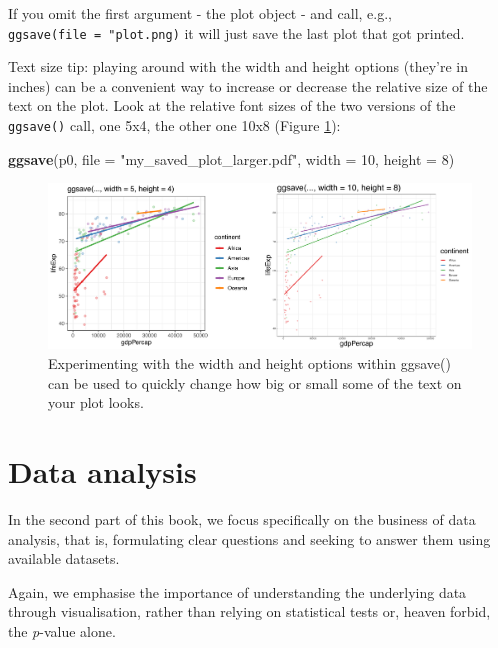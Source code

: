 \documentclass[
  12pt,
  krantz2]{krantz}
\makeatletter
\newenvironment{Shaded}{\begin{snugshade}}{\end{snugshade}}
\newcommand{\DataTypeTok}[1]{\textcolor[rgb]{0.13,0.29,0.53}{#1}}
\newcommand{\DecValTok}[1]{\textcolor[rgb]{0.00,0.00,0.81}{#1}}
\newcommand{\KeywordTok}[1]{\textcolor[rgb]{0.13,0.29,0.53}{\textbf{#1}}}
\newcommand{\NormalTok}[1]{#1}
\newcommand{\StringTok}[1]{\textcolor[rgb]{0.31,0.60,0.02}{#1}}
\newenvironment{kframe}{%
\medskip{}
\setlength{\fboxsep}{.8em}
 \def\at@end@of@kframe{}%
 \ifinner\ifhmode%
  \def\at@end@of@kframe{\end{minipage}}%
  \begin{minipage}{\columnwidth}%
 \fi\fi%
 \def\FrameCommand##1{\hskip\@totalleftmargin \hskip-\fboxsep
 \colorbox{shadecolor}{##1}\hskip-\fboxsep
     \hskip-\linewidth \hskip-\@totalleftmargin \hskip\columnwidth}%
 \MakeFramed {\advance\hsize-\width
   \@totalleftmargin\z@ \linewidth\hsize
   \@setminipage}}%
 {\par\unskip\endMakeFramed%
 \at@end@of@kframe}
\renewenvironment{Shaded}{\begin{kframe}}{\end{kframe}}
\makeatother
\begin{document}
If you omit the first argument - the plot object - and call, e.g., \texttt{ggsave(file\ =\ "plot.png)} it will just save the last plot that got printed.

Text size tip: playing around with the width and height options (they're in inches) can be a convenient way to increase or decrease the relative size of the text on the plot.
Look at the relative font sizes of the two versions of the \texttt{ggsave()} call, one 5x4, the other one 10x8 (Figure \ref{fig:chap05-fig-ggsave}):

\begin{Shaded}
\begin{Highlighting}[]
\KeywordTok{ggsave}\NormalTok{(p0, }\DataTypeTok{file =} \StringTok{"my_saved_plot_larger.pdf"}\NormalTok{, }\DataTypeTok{width =} \DecValTok{10}\NormalTok{, }\DataTypeTok{height =} \DecValTok{8}\NormalTok{)}
\end{Highlighting}
\end{Shaded}

\begin{figure}
\includegraphics[width=1\linewidth]{images/chapter05/healthyr_ggsave} \caption{Experimenting with the width and height options within ggsave() can be used to quickly change how big or small some of the text on your plot looks.}\label{fig:chap05-fig-ggsave}
\end{figure}

\hypertarget{part-data-analysis}{%
\part{Data analysis}\label{part-data-analysis}}

In the second part of this book, we focus specifically on the business of data analysis, that is, formulating clear questions and seeking to answer them using available datasets.

Again, we emphasise the importance of understanding the underlying data through visualisation, rather than relying on statistical tests or, heaven forbid, the \emph{p}-value alone.
\end{document}
